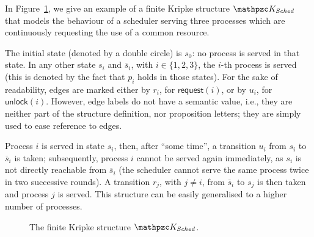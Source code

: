 \begin{example}\label{example:Ksched}
In Figure~\ref{KSched}, we give an example of a finite Kripke structure $\Ku_{Sched}$ that models the behaviour of a scheduler serving three processes which are continuously requesting the use of a common resource. 

The initial state (denoted by a double circle) 
is $s_0$: no process is served in that state. In any other state $s_i$ and $\overline{s}_i$, with $i \in \{1,2,3\}$, the $i$-th process is served (this is denoted by the fact that $p_i$ holds in those 
states). For the sake of readability, edges are marked either by $r_i$, for $\mathsf{request}(i)$, or by $u_i$, for $\mathsf{unlock}(i)$. However, edge labels do not have a semantic value, i.e., they are neither part of the structure definition, nor proposition letters; they are simply used to ease reference to edges. 

Process $i$ is served in state $s_i$, then, after ``some time'', a transition $u_i$ from $s_i$ to $\overline{s}_i$ is taken; subsequently, process $i$ cannot be served again immediately, as $s_i$ is not directly reachable from $\overline{s}_i$ (the scheduler cannot serve the same process twice in two successive rounds). A transition $r_j$, with $j\neq i$, from $\overline{s}_i$ to $s_j$ is then taken and process $j$ is served. This structure can be easily generalised to a higher number of processes.

\begin{figure}[H]
\centering
{}
\vspace{-1.4cm}
\caption{The finite Kripke structure $\Ku_{Sched}$.}\label{KSched}
\end{figure}


\end{example}
